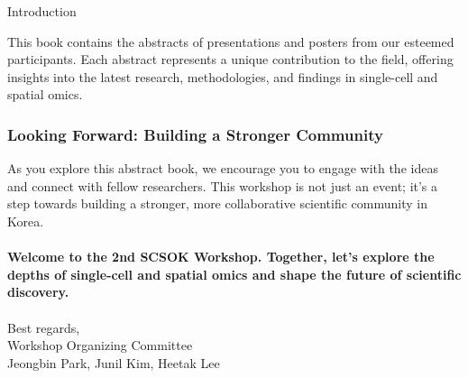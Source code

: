 \begin{coverpage}{Introduction}
{This book contains the abstracts of presentations and posters from our esteemed participants. Each abstract represents a unique contribution to the field, offering insights into the latest research, methodologies, and findings in single-cell and spatial omics.
\\
\subsubsection*{Looking Forward: Building a Stronger Community}
As you explore this abstract book, we encourage you to engage with the ideas and connect with fellow researchers. This workshop is not just an event; it's a step towards building a stronger, more collaborative scientific community in Korea.
\\
\\
\textbf{Welcome to the 2nd SCSOK Workshop. Together, let's explore the depths of single-cell and spatial omics and shape the future of scientific discovery.}
\\
\vspace{1cm}
\\
\noindent
Best regards, \\ Workshop Organizing Committee \\ Jeongbin Park, Junil Kim, Heetak Lee
}
\end{coverpage}